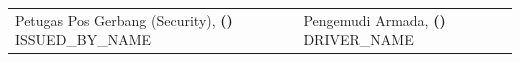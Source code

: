 \documentclass[11pt,a4paper]{article}
\begin{document}
\vspace{1.2cm}
\noindent
\begin{tabularx}{\textwidth}{@{} X X @{}}
  \centering
  Petugas Pos Gerbang (Security), \vspace{1.8cm} \newline
  \textbf{(\underline{\hspace{4.5cm}})} \newline
  {\small {{ISSUED_BY_NAME}}} &
  \centering
  Pengemudi Armada, \vspace{1.8cm} \newline
  \textbf{(\underline{\hspace{4.5cm}})} \newline
  {\small {{DRIVER_NAME}}}
\end{tabularx}
\end{document}
